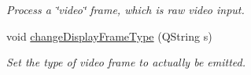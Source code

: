 \begin{DoxyCompactItemize}
\begin{DoxyCompactList}\small\item\em Process a \char`\"{}video\char`\"{} frame, which is raw video input. \end{DoxyCompactList}\item 
void \hyperlink{classTrackingStream_a5208b5276288c0f47689906999d82841}{change\+Display\+Frame\+Type} (Q\+String s)\hypertarget{classTrackingStream_a5208b5276288c0f47689906999d82841}{}\label{classTrackingStream_a5208b5276288c0f47689906999d82841}

\begin{DoxyCompactList}\small\item\em Set the type of video frame to actually be emitted. \end{DoxyCompactList}\end{DoxyCompactItemize}
